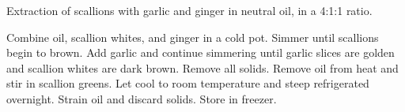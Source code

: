 \documentclass[main]{subfiles}
\begin{document}
Extraction of scallions with garlic and ginger in neutral oil, in a 4:1:1 ratio.

\begin{rec}
Combine oil, scallion whites, and ginger in a cold pot.
Simmer until scallions begin to brown.
Add garlic and continue simmering until garlic slices are golden and scallion whites are dark brown.
Remove all solids.
\newstep
{}
Remove oil from heat and stir in scallion greens.
Let cool to room temperature and steep refrigerated overnight.
\newstep
Strain oil and discard solids. Store in freezer.
\end{rec}
\end{document}
